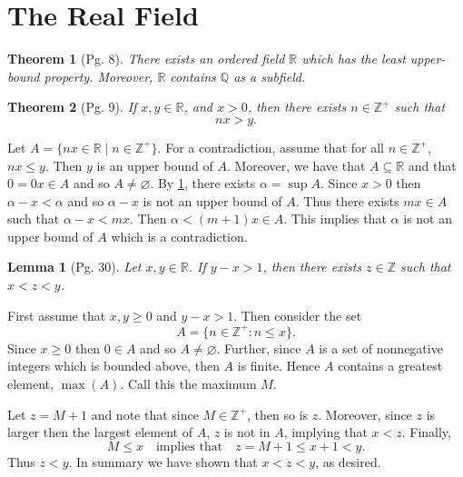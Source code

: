 \documentclass[leqno]{article}
\makeatletter
\newtheorem{theorem}{Theorem}[section]
\newtheorem{lemma}{Lemma}[theorem]
\theoremstyle{definition}
\theoremstyle{remark}
\let\oldproofname=\proofname
\renewcommand{\proofname}{\bf{\textit{\oldproofname}}}
\renewenvironment{proof}[1][\proofname]{\par
  \pushQED{\qed}%
  \normalfont \topsep6\p@\@plus6\p@\relax
  \list{}{\leftmargin=0mm
          \rightmargin=0mm
          \settowidth{\itemindent}{\itshape#1}%
          \labelwidth=4mm
          \parsep=0pt \listparindent=0mm%
  }
  \item[\hskip\labelsep
        \itshape
    #1\@addpunct{.}]\ignorespaces
}{%
  \popQED\endlist\@endpefalse
}
\makeatother
\begin{document}
    \section{The Real Field}
        \begin{theorem}[Pg. 8]\label{thm:3.1}
            There exists an ordered field $\mathbb{R}$ which has the least upper-bound property. Moreover, $\mathbb{R}$ contains $\mathbb{Q}$ as a subfield. 
        \end{theorem}
            \begin{proof}
            
            \end{proof}
        \begin{theorem}[Pg. 9]\label{thm:3.2}
            If $x,y\in\mathbb{R}$, and $x>0$, then there exists $n\in\mathbb{Z}^{+}$ such that 
                \begin{equation*}
                    nx>y.
                \end{equation*} 
        \end{theorem}
            \begin{proof}
                Let $A=\{nx\in\mathbb{R}\mid n\in\mathbb{Z}^{+}\}$. For a contradiction, assume that for all $n\in\mathbb{Z}^{+}$, $nx\leq y$. Then $y$ is an upper bound of $A$. Moreover, we have that $A\subseteq\mathbb{R}$ and that $0=0x\in A$ and so $A\neq\varnothing$. By \cref{thm:3.1}, there exists $\alpha=\sup A$. Since $x>0$ then $\alpha-x<\alpha$ and so $\alpha-x$ is not an upper bound of $A$. Thus there exists $mx\in A$ such that $\alpha-x<mx$. Then $\alpha<(m+1)x\in A$. This implies that $\alpha$ is not an upper bound of $A$ which is a contradiction.
            \end{proof}
        \begin{lemma}[Pg. 30]\label{lem:3.2.1}
            Let $x,y\in\mathbb{R}$. If $y-x>1$, then there exists $z\in\mathbb{Z}$ such that $x<z<y$. 
        \end{lemma}
            \begin{proof}
                First assume that $x,y\geq 0$ and $y-x>1$. Then consider the set 
                    \begin{equation*}
                        A=\{n\in\mathbb{Z}^{+}\colon n\leq x\}.
                    \end{equation*}
              Since $x\geq 0$ then $0\in A$ and so $A\neq \varnothing$. Further, since $A$ is a set of nonnegative integers which is bounded above, then $A$ is finite. Hence $A$ contains a greatest element, $\max(A)$. Call this the maximum $M$.\par\hspace{4mm} Let $z=M+1$ and note that since $M\in\mathbb{Z}^{+}$, then so is $z$. Moreover, since $z$ is larger then the largest element of $A$, $z$ is not in $A$, implying that $x<z$. Finally, 
                \begin{equation*}
                    M\leq x\quad\text{implies that}\quad z=M+1\leq x+1<y.
                \end{equation*}
            Thus $z<y$. In summary we have shown that $x<z<y$, as desired. \cite{cum}
            \end{proof}
\end{document}
